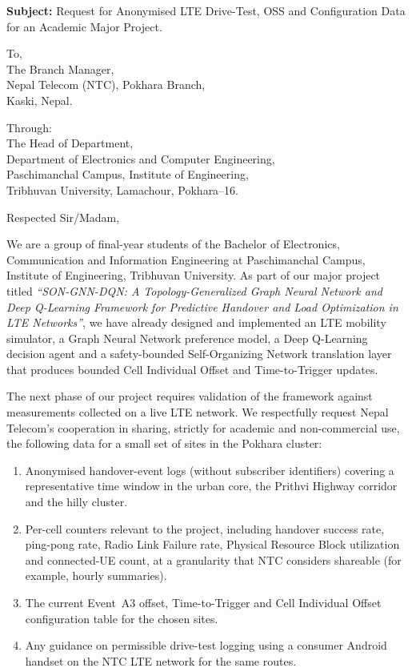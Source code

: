 \documentclass[12pt,a4paper,oneside]{report}
\begin{document}
\noindent\textbf{Subject:} Request for Anonymised LTE Drive-Test, OSS
and Configuration Data for an Academic Major Project.

\vspace{0.6cm}
\noindent To,\\
The Branch Manager,\\
Nepal Telecom (NTC), Pokhara Branch,\\
Kaski, Nepal.

\vspace{0.4cm}
\noindent Through:\\
The Head of Department,\\
Department of Electronics and Computer Engineering,\\
Paschimanchal Campus, Institute of Engineering,\\
Tribhuvan University, Lamachour, Pokhara--16.

\vspace{0.4cm}
\noindent Respected Sir/Madam,

We are a group of final-year students of the Bachelor of Electronics,
Communication and Information Engineering at Paschimanchal Campus,
Institute of Engineering, Tribhuvan University. As part of our major
project titled \textit{``SON-GNN-DQN: A Topology-Generalized Graph
Neural Network and Deep Q-Learning Framework for Predictive Handover
and Load Optimization in LTE Networks''}, we have already designed and
implemented an LTE mobility simulator, a Graph Neural Network
preference model, a Deep Q-Learning decision agent and a safety-bounded
Self-Organizing Network translation layer that produces bounded Cell
Individual Offset and Time-to-Trigger updates.

The next phase of our project requires validation of the framework
against measurements collected on a live LTE network. We respectfully
request Nepal Telecom's cooperation in sharing, strictly for academic
and non-commercial use, the following data for a small set of sites in
the Pokhara cluster:

\begin{enumerate}[leftmargin=*]
    \item Anonymised handover-event logs (without subscriber
    identifiers) covering a representative time window in the urban
    core, the Prithvi Highway corridor and the hilly cluster.
    \item Per-cell counters relevant to the project, including
    handover success rate, ping-pong rate, Radio Link Failure rate,
    Physical Resource Block utilization and connected-UE count, at a
    granularity that NTC considers shareable (for example, hourly
    summaries).
    \item The current Event~A3 offset, Time-to-Trigger and Cell
    Individual Offset configuration table for the chosen sites.
    \item Any guidance on permissible drive-test logging using a
    consumer Android handset on the NTC LTE network for the same
    routes.
\end{enumerate}
\end{document}
